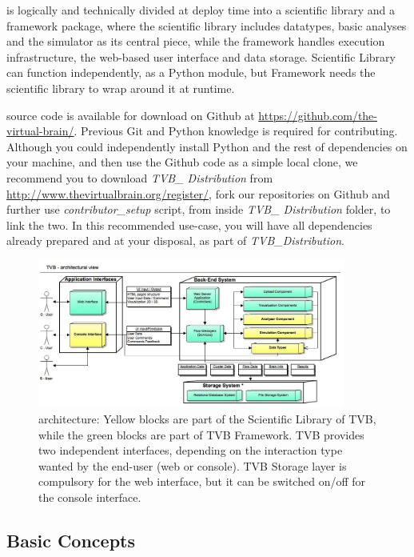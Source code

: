 
\TVB is logically and technically divided at deploy time into a scientific library and a framework package, 
where the scientific library includes datatypes, basic analyses and the simulator as its central piece,
while the framework handles execution infrastructure, the web-based user interface and data storage. 
 \TVB Scientific Library can function independently, as a Python module, but \TVB Framework needs 
the scientific library to wrap around it at runtime.

\TVB source code is available for download on Github at \url{https://github.com/the-virtual-brain/}. 
Previous Git and Python knowledge is required for contributing.
Although you could independently install Python and the rest of \TVB dependencies on your machine, 
and then use the Github code as a simple local clone, we recommend you to download \emph{TVB\_ Distribution}
from \url{http://www.thevirtualbrain.org/register/}, fork our repositories on Github and further use
\emph{contributor\_setup} script, from inside \emph{TVB\_ Distribution} folder, to link the two. 
In this recommended use-case, you will have all \TVB dependencies already prepared and at your disposal, 
as part of \emph{TVB\_Distribution}.

 \begin{figure}
        \centering
        \includegraphics[width=0.90\textwidth]{images/architecture.jpg}
        \caption{\TVB architecture: 
        Yellow blocks are part of the Scientific Library of TVB, while the green blocks are part of TVB Framework.
        TVB provides two independent interfaces, depending on the interaction type wanted by the end-user (web or console).
        TVB Storage layer is compulsory for the web interface, but it can be switched on/off for the console interface.
         }
        \label{fig:architecture}
 \end{figure}

	\subsection{Basic Concepts}

